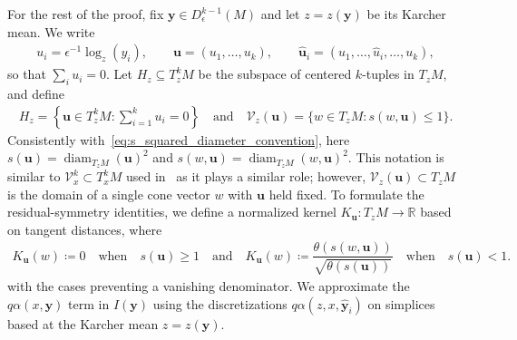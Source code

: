 \documentclass[11pt,reqno]{amsproc}
\numberwithin{equation}{section}
\newcommand{\R}{\mathbb{R}}
\newcommand{\by}{\mathbf{y}}
\newcommand{\bu}{\mathbf{u}}
\newcommand{\cV}{\mathcal{V}}
\newcommand{\diam}{\operatorname{diam}}
\newcommand{\andd}{\quad \text{and} \quad}
\theoremstyle{definition}
\theoremstyle{plain}
\begin{document}
For the rest of the proof, fix $\by\in D^{k-1}_\epsilon(M)$ and let $z=z(\by)$ be its Karcher mean. We write
\begin{align}
    u_i = \epsilon^{-1}\log_z(y_i), \qquad \bu=(u_1,\ldots,u_k), \qquad \hat{\bu}_i=(u_1,\ldots,\hat u_i,\ldots,u_k),
\end{align}
so that $\sum_i u_i=0$. Let $H_z \subseteq T_z^kM$ be the subspace of centered $k$-tuples in $T_zM$, and define
\begin{align} \label{eq:Hz_and_cV}
    H_z = \left\{\bu\in T_z^kM : \sum_{i=1}^k u_i=0\right\} \andd \cV_z(\bu)=\{w\in T_zM:s(w,\bu)\leq 1\}.
\end{align}
Consistently with~\eqref{eq:s_squared_diameter_convention}, here $s(\bu)=\diam_{T_zM}(\bu)^2$ and $s(w,\bu)=\diam_{T_zM}(w,\bu)^2$. 
This notation is similar to $\cV_x^k\subset T_x^kM$ used in~ as it plays a similar role; however, $\cV_z(\bu)\subset T_zM$ is the domain of a single cone vector $w$ with $\bu$ held fixed.
To formulate the residual-symmetry identities, we define a normalized kernel $K_\bu: T_z M \to  \R$ based on tangent distances, where \label{not:normalized_tangent_kernel}
\begin{align}
    K_\bu(w) \coloneqq 0 \quad \text{when}\quad  s(\bu) \geq 1 \andd K_\bu(w) \coloneqq \dfrac{\theta(s(w,\bu))}{\sqrt{\theta(s(\bu))}} \quad \text{when} \quad s(\bu) < 1.
\end{align} with the cases preventing a vanishing denominator. 
We approximate the $q\alpha(x,\by)$ term in $I(\by)$ using the discretizations $q\alpha(z, x, \hat{\by}_i)$ on simplices based at the Karcher mean $z = z(\by)$. 
\end{document}
